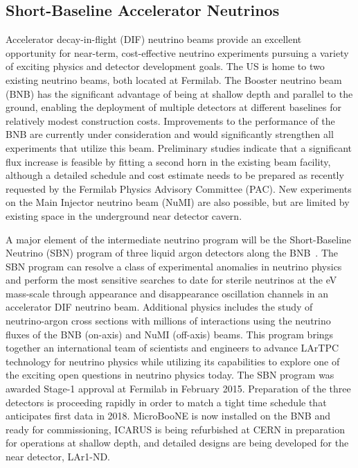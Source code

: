 \subsection{Short-Baseline Accelerator Neutrinos}
\label{sec:AcceleratorSB}

Accelerator decay-in-flight (DIF) neutrino beams provide an excellent
opportunity for near-term, cost-effective neutrino experiments
pursuing a variety of exciting physics and detector development goals.
The US is home to two existing neutrino beams, both located at
Fermilab.  The Booster neutrino beam (BNB) has the significant
advantage of being at shallow depth and parallel to the ground,
enabling the deployment of multiple detectors at different baselines
for relatively modest construction costs.  Improvements to the
performance of the BNB are currently under consideration and would
significantly strengthen all experiments that utilize this beam.
Preliminary studies indicate that a significant flux increase is
feasible by fitting a second horn in the existing beam facility,
although a detailed schedule and cost estimate needs to be prepared as
recently requested by the Fermilab Physics Advisory Committee
(PAC). New experiments on the Main Injector neutrino beam (NuMI) are
also possible, but are limited by existing space in the underground
near detector cavern.

A major element of the intermediate neutrino program will be the
Short-Baseline Neutrino (SBN) program of three liquid argon detectors
along the BNB~\cite{SBNProposal}.  The SBN program can resolve a class
of experimental anomalies in neutrino physics and perform the most
sensitive searches to date for sterile neutrinos at the eV mass-scale
through appearance and disappearance oscillation channels in an
accelerator DIF neutrino beam.  Additional physics includes the study
of neutrino-argon cross sections with millions of interactions using
the neutrino fluxes of the BNB (on-axis) and NuMI (off-axis) beams.
This program brings together an international team of scientists and
engineers to advance LArTPC technology for neutrino physics while
utilizing its capabilities to explore one of the exciting open
questions in neutrino physics today.  The SBN program was awarded
Stage-1 approval at Fermilab in February 2015.  Preparation of the
three detectors is proceeding rapidly in order to match a tight time
schedule that anticipates first data in 2018.  MicroBooNE is now
installed on the BNB and ready for commissioning, ICARUS is being
refurbished at CERN in preparation for operations at shallow depth,
and detailed designs are being developed for the near detector,
LAr1-ND.


